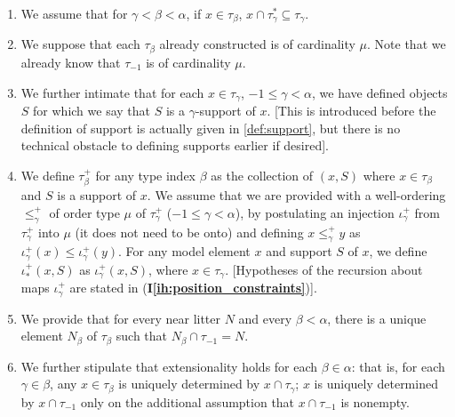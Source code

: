 \documentclass{article}
\theoremstyle{definition}
\theoremstyle{remark}
\newcommand{\ihref}[1]{(\textbf{I\ref{#1}})}
\begin{document}
\begin{enumerate}

\renewcommand{\labelenumi}{(\textbf{I\theenumi})}

\item \label{ih:subset_tau} We assume that for $\gamma<\beta<\alpha$, if $x \in \tau_\beta$, $x \cap \tau^*_\gamma \subseteq \tau_\gamma$.

\item \label{ih:cardinality} We suppose that each $\tau_\beta$ already constructed is of cardinality $\mu$.  Note that we already know that
$\tau_{-1}$ is of cardinality $\mu$.

\item \label{ih:supports} We further intimate that for each $x \in \tau_\gamma$, $-1\leq \gamma<\alpha$, we have defined objects $S$ for which we say that $S$ is a $\gamma$-support of $x$.  [This is introduced before the definition of support is actually given in \ref{def:support}, but there is  no technical obstacle to defining supports earlier if desired].

\item \label{ih:position} We define $\tau_\beta^+$ for any type index $\beta$ as the collection of $(x,S)$ where $x \in \tau_\beta$ and $S$ is a support of $x$.  We assume that we are provided with  a well-ordering $\leq^+_\gamma$ of order type $\mu$ of $\tau_\gamma^+$ ($-1 \leq \gamma <\alpha$), by postulating an injection $\iota^+_\gamma$ from $\tau_\gamma^+$ into $\mu$ (it does not need to be onto) and defining $x \leq^+_\gamma y$ as $\iota^+_\gamma(x) \leq \iota^+_\gamma(y)$.    For any model element $x$ and support $S$ of $x$, we define $\iota^+_*(x,S)$ as $\iota^+_\gamma(x,S)$, where $x \in \tau_\gamma$.    [Hypotheses of the recursion about maps $\iota^+_\gamma$ are stated {in \ihref{ih:position_constraints}}].

\item \label{ih:typed_near_litter} We provide that for every near litter $N$ and every $\beta<\alpha$, there is a unique element $N_\beta$ of $\tau_\beta$ such that $N_\beta \cap \tau_{-1}=N$.

\item \label{ih:extensionality} We further stipulate that extensionality holds for each $\beta\in \alpha$: that is,  for each $\gamma\in \beta$, any $x \in \tau_\beta$ is uniquely determined by $x \cap \tau_\gamma$; $x$ is uniquely determined by $x \cap \tau_{-1}$ only on the additional assumption that $x \cap \tau_{-1}$ is nonempty.


\end{enumerate}
\end{document}
